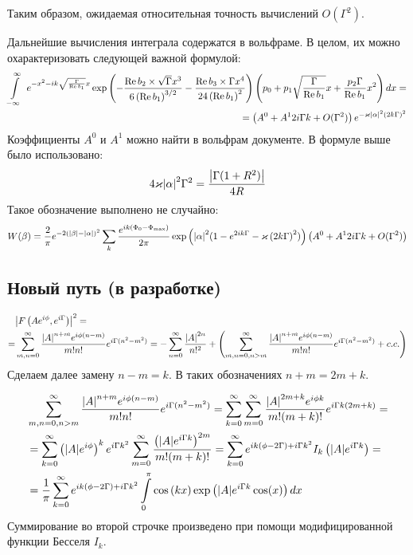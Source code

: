 \documentclass[a4paper, 12pt]{article}
\DeclareMathOperator*{\Real}{Re}
\newenvironment{eqw}{\begin{equation} \begin{aligned}}   
    {\end{aligned}    \end{equation}}
\begin{document}
Таким образом, ожидаемая относительная точность вычислений $O(\Gamma^{2})$.

Дальнейшие вычисления интеграла содержатся в вольфраме. В целом, их можно охарактеризовать следующей важной формулой:
\begin{eqw}
    \int\limits_{-\infty}^{\infty}\
    e^{-x^2 - ik\sqrt{\frac{\Gamma}{\Real b_1}}x} \exp\left(-\frac{\Real b_2 \times\sqrt{\Gamma} x^3}{6\left(\Real b_1\right)^{3/2}} - \frac{\Real b_3\times \Gamma x^4}{24\left(\Real b_1\right)^{2}} \right)
    \left(p_0 + p_1\sqrt{\frac{\Gamma}{\Real b_1}}x +\frac{p_2\Gamma}{\Real b_1}x^2\right) dx = \\
    = \left(A^0 + A^1 2i\Gamma k + O(\Gamma^2)\right) e^{-\varkappa \abs{\alpha}^2 \left(2k{\Gamma}\right)^2}
\end{eqw}
Коэффициенты $A^0$ и $A^1$ можно найти в вольфрам документе. В формуле выше было использовано:
\begin{eqw}
    4\varkappa \abs{\alpha}^2\Gamma^2 = \frac{\abs{\Gamma (1+R^2)}}{4R}
\end{eqw}
Такое обозначение выполнено не случайно:
\begin{eqw}
     W(\beta) = \frac{2}{\pi}e^{-2\left(\abs{\beta} - \abs{\alpha}\right)^2}
     \sum\limits_k \frac{e^{ik\left(\Phi_0-\Phi_{\max}\right)}}{2\pi}
     \exp\left(\abs{\alpha}^2 (1-e^{2ik\Gamma}-\varkappa \left(2k{\Gamma}\right)^2)\right) \left(A^0 + A^1 2i\Gamma k + O(\Gamma^2)\right)
\end{eqw}
\subsection*{Новый путь (в разработке)}
\begin{eqw}
     &\abs{F\left(Ae^{i\phi}, e^{i\Gamma}\right)}^2 =\\
     =&\sum_{m, n = 0}^{\infty} \frac{\abs{A}^{n+m}e^{i\phi(n-m)}}{m!n!} e^{i\Gamma(n^2 - m^2)} = -\sum_{n=0}^{\infty} \frac{\abs{A}^{2n}}{n!^2} + \left(\sum_{m, n = 0, n>m}^{\infty}\frac{\abs{A}^{n+m}e^{i\phi(n-m)}}{m!n!} e^{i\Gamma(n^2 - m^2)} + c.c.\right)
\end{eqw}
Сделаем далее замену $n-m=k$. В таких обозначениях $n+m = 2m+k$.

\begin{eqw}
    &\sum_{m, n = 0, n>m}^{\infty}\frac{\abs{A}^{n+m}e^{i\phi(n-m)}}{m!n!}e^{i\Gamma(n^2 - m^2)} = \sum_{k=0}^{\infty}\sum_{m=0}^{\infty}\frac{\abs{A}^{2m+k}e^{i\phi k}}{m!(m+k)!}e^{i\Gamma k(2m+k)} = \\
    &=\sum_{k=0}^{\infty}\left(\abs{A} e^{i\phi}\right)^{k}e^{i\Gamma k^2}\sum_{m=0}^{\infty}\frac{\left(\abs{A}e^{i\Gamma k}\right)^{2m}}{m!(m+k)!} = \sum_{k=0}^{\infty}e^{ik(\phi - 2\Gamma)+i\Gamma k^2}I_{k}\left(\abs{A}e^{i\Gamma k}\right)=\\
    &=\frac{1}{\pi}\sum_{k=0}^{\infty}e^{ik(\phi - 2\Gamma)+i\Gamma k^2}\int\limits_0^{\pi}\cos\left(k x\right)\exp\left(\abs{A}e^{i\Gamma k}\cos(x)\right)dx
\end{eqw}
Суммирование во второй строчке произведено при помощи модифицированной функции Бесселя $I_k$.
\end{document}
